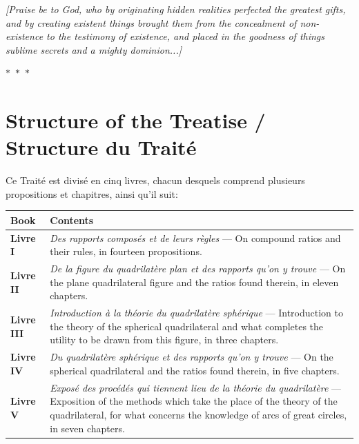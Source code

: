 \documentclass[11pt,a4paper]{article}
\theoremstyle{plain}
\theoremstyle{definition}
\theoremstyle{remark}
\newcommand{\ornament}{\begin{center}\textcolor{goldaccent}{$\ast$~$\ast$~$\ast$}\end{center}}
\begin{document}
\vspace{0.3cm}
\noindent\textcolor{notecolor}{\textit{[Praise be to God, who by originating hidden realities perfected the greatest gifts, and by creating existent things brought them from the concealment of non-existence to the testimony of existence, and placed in the goodness of things sublime secrets and a mighty dominion...]}}

\ornament

\section*{Structure of the Treatise / Structure du Traité}


Ce Traité est divisé en cinq livres, chacun desquels comprend plusieurs propositions et chapitres, ainsi qu'il suit:


\begin{center}
\begin{longtable}{lp{10cm}}
\toprule
\textbf{Book} & \textbf{Contents} \\
\midrule
\endhead

\textbf{Livre I} & \textit{Des rapports composés et de leurs règles} --- On compound ratios and their rules, in fourteen propositions. \\
\addlinespace[0.3cm]

\textbf{Livre II} & \textit{De la figure du quadrilatère plan et des rapports qu'on y trouve} --- On the plane quadrilateral figure and the ratios found therein, in eleven chapters. \\
\addlinespace[0.3cm]

\textbf{Livre III} & \textit{Introduction à la théorie du quadrilatère sphérique} --- Introduction to the theory of the spherical quadrilateral and what completes the utility to be drawn from this figure, in three chapters. \\
\addlinespace[0.3cm]

\textbf{Livre IV} & \textit{Du quadrilatère sphérique et des rapports qu'on y trouve} --- On the spherical quadrilateral and the ratios found therein, in five chapters. \\
\addlinespace[0.3cm]

\textbf{Livre V} & \textit{Exposé des procédés qui tiennent lieu de la théorie du quadrilatère} --- Exposition of the methods which take the place of the theory of the quadrilateral, for what concerns the knowledge of arcs of great circles, in seven chapters. \\
\bottomrule
\end{longtable}
\end{center}
\end{document}
